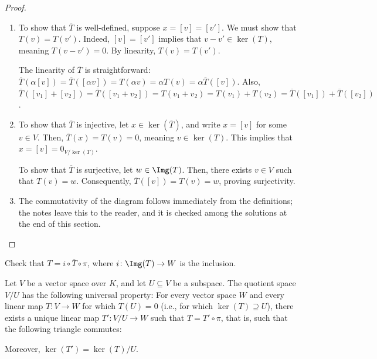 \begin{proof}
  \begin{enumerate}
    \item To show that $\overline{T}$ is well-defined, suppose $x = [v] = [v']$. We must show that $T(v) = T(v')$. Indeed, $[v] = [v']$ implies that $v - v' \in \ker(T)$, meaning $T(v - v') = 0$. By linearity, $T(v) = T(v')$.

    The linearity of $\overline{T}$ is straightforward: $\overline{T}(\alpha[v]) = \overline{T}([\alpha v]) = T(\alpha v) = \alpha T(v) = \alpha \overline{T}([v])$. Also, $\overline{T}([v_1] + [v_2]) = \overline{T}([v_1 + v_2]) = T(v_1 + v_2) = T(v_1) + T(v_2) = \overline{T}([v_1]) + \overline{T}([v_2])$.

    \item To show that $\overline{T}$ is injective, let $x \in \ker(\overline{T})$, and write $x = [v]$ for some $v \in V$. Then, $\overline{T}(x) = T(v) = 0$, meaning $v \in \ker(T)$. This implies that $x = [v] = 0_{V/\ker(T)}$.

    To show that $\overline{T}$ is surjective, let $w \in \Img(T)$. Then, there exists $v \in V$ such that $T(v) = w$. Consequently, $\overline{T}([v]) = T(v) = w$, proving surjectivity.

    \item The commutativity of the diagram follows immediately from the definitions; the notes leave this to the reader, and it is checked among the solutions at the end of this section.
  \end{enumerate}
\end{proof}

\begin{exercise}
  \label{exc:first_iso_diagram}
  Check that $T = i \circ \overline{T} \circ \pi$, where $i \colon \Img(T) \to W$ is the inclusion.
\end{exercise}


\begin{theorem}
  \label{thm:universal_property_quotient}
  Let $V$ be a vector space over $K$, and let $U \subseteq V$ be a subspace. The quotient space $V/U$ has the following universal property: For every vector space $W$ and every linear map $T \colon V \to W$ for which $T(U) = 0$ (i.e., for which $\ker(T) \supseteq U$), there exists a unique linear map $T' \colon V/U \to W$ such that $T = T' \circ \pi$, that is, such that the following triangle commutes:
  \begin{center}
  \end{center}
  Moreover, $\ker(T') = \ker(T)/U$.
\end{theorem}

